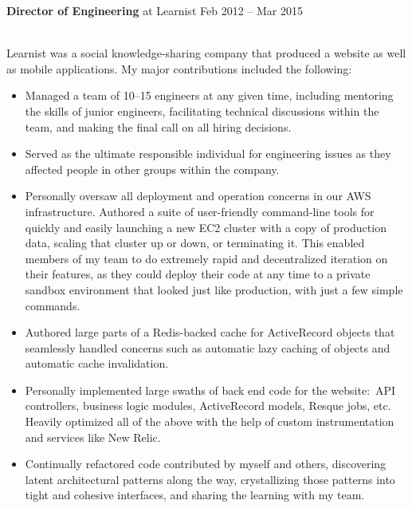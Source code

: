 \documentclass[10pt]{article}
\begin{document}
\headedsection
  {\textbf{Director of Engineering} at Learnist}
  {Feb 2012 -- Mar 2015}
  {\\Learnist was a social knowledge-sharing company that produced a website as well as mobile
    applications.  My major contributions included the following:
   \begin{itemize}
   \item Managed a team of 10--15 engineers at any given time, including mentoring the skills of
     junior engineers, facilitating technical discussions within the team, and making the final
     call on all hiring decisions.
   \item Served as the ultimate responsible individual for engineering issues as they affected
     people in other groups within the company.
   \item Personally oversaw all deployment and operation concerns in our AWS
     infrastructure. Authored a suite of user-friendly command-line tools for quickly and easily
     launching a new EC2 cluster with a copy of production data, scaling that cluster up or
     down, or terminating it.  This enabled members of my team to do extremely rapid and
     decentralized iteration on their features, as they could deploy their code at any time to a
     private sandbox environment that looked just like production, with just a few simple
     commands.
   \item Authored large parts of a Redis-backed cache for ActiveRecord objects that seamlessly
     handled concerns such as automatic lazy caching of objects and automatic cache
     invalidation.
   \item Personally implemented large swaths of back end code for the website:\ API controllers,
     business logic modules, ActiveRecord models, Resque jobs, etc.  Heavily optimized all of
     the above with the help of custom instrumentation and services like New Relic.
   \item Continually refactored code contributed by myself and others, discovering latent
     architectural patterns along the way, crystallizing those patterns into tight and cohesive
     interfaces, and sharing the learning with my team.
   \end{itemize}}
\end{document}
